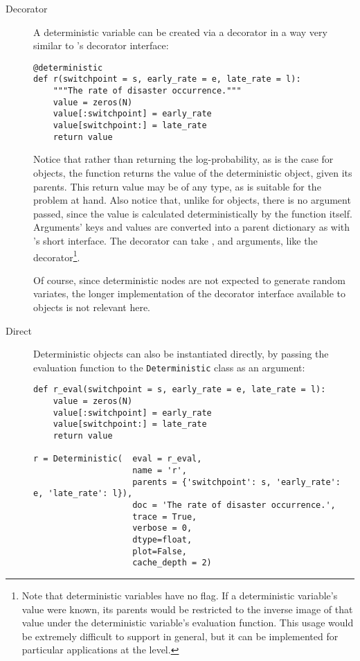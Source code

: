 \begin{description}
    \item[Decorator] A deterministic variable can be created via a decorator in a way very similar to 's decorator interface:
\begin{verbatim}
@deterministic
def r(switchpoint = s, early_rate = e, late_rate = l):
    """The rate of disaster occurrence."""
    value = zeros(N)
    value[:switchpoint] = early_rate
    value[switchpoint:] = late_rate
    return value
\end{verbatim}
Notice that rather than returning the log-probability, as is the case for  objects, the function returns the value of the deterministic object, given its parents. This return value may be of any type, as is suitable for the problem at hand. Also notice that, unlike for  objects, there is no  argument passed, since the value is calculated deterministically by the function itself. Arguments' keys and values are converted into a parent dictionary as with 's short interface. The  decorator can take ,  and  arguments, like the  decorator\footnote{Note that deterministic variables have no  flag. If a deterministic variable's value were known, its parents would be restricted to the inverse image of that value under the deterministic variable's evaluation function. This usage would be extremely difficult to support in general, but it can be implemented for particular applications at the  level.}.

Of course, since deterministic nodes are not expected to generate random variates, the longer implementation of the decorator interface available to  objects is not relevant here.

    \item[Direct] Deterministic objects can also be instantiated directly, by passing the evaluation function to the \texttt{Deterministic} class as an argument:
\begin{verbatim}
def r_eval(switchpoint = s, early_rate = e, late_rate = l):
    value = zeros(N)
    value[:switchpoint] = early_rate
    value[switchpoint:] = late_rate
    return value

r = Deterministic(  eval = r_eval,
                    name = 'r',
                    parents = {'switchpoint': s, 'early_rate': e, 'late_rate': l}),
                    doc = 'The rate of disaster occurrence.',
                    trace = True,
                    verbose = 0,
                    dtype=float,
                    plot=False,
                    cache_depth = 2)
\end{verbatim}
\end{description}

